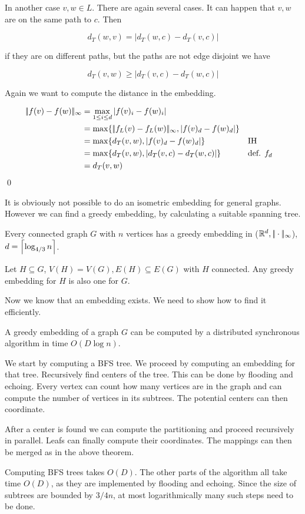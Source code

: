\begin{pr}
In another case $v,w \in L$. There are again several cases. It can happen that $v,w$ are on the same path to $c$. Then

\[d_T(w,v) = | d_T(w,c)-d_T(v,c)|\]

if they are on different paths, but the paths are not edge disjoint we have

\[d_T(v,w) \geq |d_T(v,c) - d_T(w,c)|\] 

Again we want to compute the distance in the embedding.

\begin{align*}
|\!|f(v)-f(w)|\!|_\infty &= \max_{1\leq i\leq d} |f(v)_i-f(w)_i|\\
	&=\max \{	|\!|f_L(v)-f_L(w)|\!|_\infty, |f(v)_d-f(w)_d|\}\\
	&=\max\{ d_T(v,w), |f(v)_d-f(w)_d|\} && \text{IH}\\
	&=\max\{ d_T(v,w), |d_T(v,c)-d_T(w,c)|\} && \text{def. $f_d$}\\
	&= d_T(v,w)
\end{align*}
\hfill\qed
\end{pr}

It is obviously not possible to do an isometric embedding for general graphs. However we can find a greedy embedding, by calculating a suitable spanning tree.

\begin{thm} Every connected graph $G$ with $n$ vertices has a greedy embedding in ($\mathbb{R}^d,|\!|\cdot|\!|_{\infty}$), $d=\left\lceil \log_{4/3}n \right\rceil$.
\end{thm}

\begin{pr}
Let $H\subseteq G$, $V(H) = V(G), E(H) \subseteq E(G)$ with $H$ connected. Any greedy embedding for $H$ is also one for $G$. 
\end{pr}

Now we know that an embedding exists. We need to show how to find it efficiently.

\begin{thm} A greedy embedding of a graph $G$ can be computed by a distributed synchronous algorithm in time $O(D\log n)$.\end{thm}

\begin{pr}[Sketch.] We start by computing a BFS tree. We proceed by computing an embedding for that tree. Recursively find centers of the tree. This can be done by flooding and echoing. Every vertex can count how many vertices are in the graph and can compute the number of vertices in its subtrees. The potential centers can then coordinate. 

After a center is found we can compute the partitioning and proceed recursively in parallel. Leafs can finally compute their coordinates. The mappings can then be merged as in the above theorem.

Computing BFS trees takes $O(D)$. The other parts of the algorithm all take time $O(D)$, as they are implemented by flooding and echoing. Since the size of subtrees are bounded by $3/4n$, at most logarithmically many such steps need to be done.
\end{pr}

